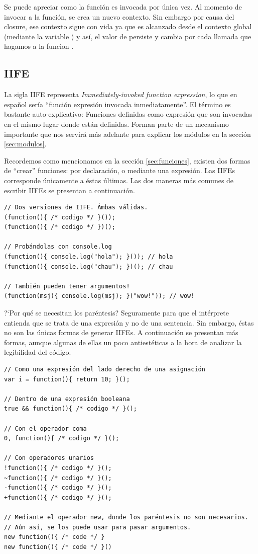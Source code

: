 Se puede apreciar como la función  es invocada por única vez. Al momento de invocar a la función, se crea un nuevo contexto. Sin embargo por causa del closure, ese contexto sigue con vida ya que es alcanzado desde el contexto global (mediante la variable ) y así, el valor de  persiste y cambia por cada llamada que hagamos a la funcion .

\subsection{IIFE}
\label{sec:iife}

La sigla IIFE representa \textit{Immediately-invoked function expression}, lo que en español sería "`función expresión invocada inmediatamente"'. El término es bastante auto-explicativo: Funciones definidas como expresión que son invocadas en el mismo lugar donde están definidas. Forman parte de un mecanismo importante que nos servirá más adelante para explicar los módulos en la sección \ref{sec:modulos}.

Recordemos como mencionamos en la sección \ref{sec:funciones}, existen dos formas de "`crear"' funciones: por declaración, o mediante una expresión. Las IIFEs corresponde únicamente a éstas últimas. Las dos maneras más comunes de escribir IIFEs se presentan a continuación.

\begin{lstlisting}[title={Introduciendo las IIFEs}]
// Dos versiones de IIFE. Ámbas válidas.
(function(){ /* codigo */ }()); 
(function(){ /* codigo */ })(); 

// Probándolas con console.log
(function(){ console.log("hola"); }()); // hola
(function(){ console.log("chau"); })(); // chau

// También pueden tener argumentos!
(function(msj){ console.log(msj); }("wow!")); // wow!
\end{lstlisting}

?`Por qué se necesitan los paréntesis? Seguramente para que el intérprete entienda que se trata de una expresión y no de una sentencia. Sin embargo, éstas no son las únicas formas de generar IIFEs. A continuación se presentan más formas, aunque algunas de ellas un poco antiestéticas a la hora de analizar la legibilidad del código.

\begin{lstlisting}[title={Otras formas de escribir IIFEs}]
// Como una expresión del lado derecho de una asignación
var i = function(){ return 10; }();

// Dentro de una expresión booleana
true && function(){ /* codigo */ }();

// Con el operador coma
0, function(){ /* codigo */ }();

// Con operadores unarios
!function(){ /* codigo */ }();
~function(){ /* codigo */ }();
-function(){ /* codigo */ }();
+function(){ /* codigo */ }();

// Mediante el operador new, donde los paréntesis no son necesarios.
// Aún así, se los puede usar para pasar argumentos.
new function(){ /* code */ }
new function(){ /* code */ }()
\end{lstlisting}

